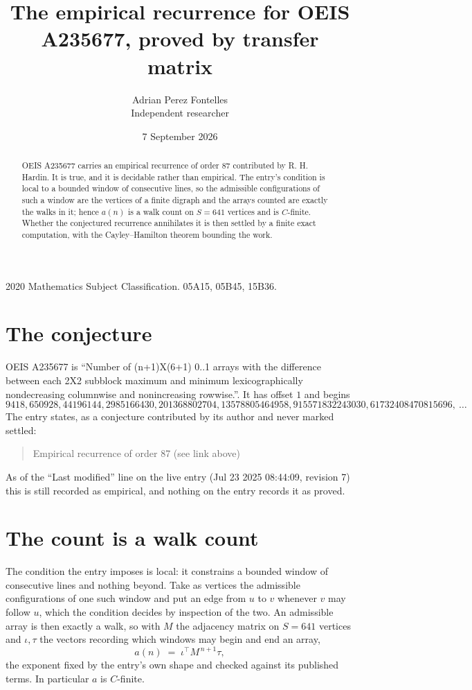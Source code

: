 \documentclass[11pt,a4paper]{article}
\title{The empirical recurrence for OEIS A235677, proved by transfer matrix}
\author{Adrian Perez Fontelles\\ \small Independent researcher}
\date{7 September 2026}
\theoremstyle{plain}
\theoremstyle{definition}
\begin{document}
\maketitle

\begin{abstract}
OEIS A235677 carries an empirical recurrence of order $87$ contributed by R. H. Hardin. It is
true, and it is decidable rather than empirical. The entry's condition is local to a bounded window of consecutive lines, so
the admissible configurations of such a window are the vertices of a finite digraph and the
arrays counted are exactly the walks in it; hence $a(n)$ is a walk count on $S=641$ vertices
and is $C$-finite. Whether the conjectured recurrence annihilates it is then settled by a
finite exact computation, with the Cayley--Hamilton theorem bounding the work.
\end{abstract}

\noindent\small 2020 Mathematics Subject Classification. 05A15, 05B45, 15B36.\normalsize

\section{The conjecture}

OEIS A235677 is ``Number of (n+1)X(6+1) 0..1 arrays with the difference between each 2X2 subblock maximum and minimum lexicographically nondecreasing columnwise and nonincreasing rowwise.''. It has offset $1$ and begins
\[
9418, 650928, 44196144, 2985166430, 201368802704, 13578805464958, 915571832243030, 61732408470815696,\ \dots
\]
The entry states, as a conjecture contributed by its author and never marked settled:
\begin{quote}
Empirical recurrence of order 87 (see link above)
\end{quote}
As of the ``Last modified'' line on the live entry (Jul 23 2025 08:44:09, revision 7) this is still
recorded as empirical, and nothing on the entry records it as proved.

\section{The count is a walk count}

The condition the entry imposes is local: it constrains a bounded window of consecutive lines and nothing beyond. Take as
vertices the admissible configurations of one such window and put an edge from $u$ to $v$
whenever $v$ may follow $u$, which the condition decides by inspection of the two. An
admissible array is then exactly a walk, so with $M$ the adjacency matrix on $S=641$ vertices
and $\iota,\tau$ the vectors recording which windows may begin and end an array,
\[
a(n)\;=\;\iota^{\!\top}M^{\,n+1}\tau ,
\]
the exponent fixed by the entry's own shape and checked against its published terms. In
particular $a$ is $C$-finite.
\end{document}
